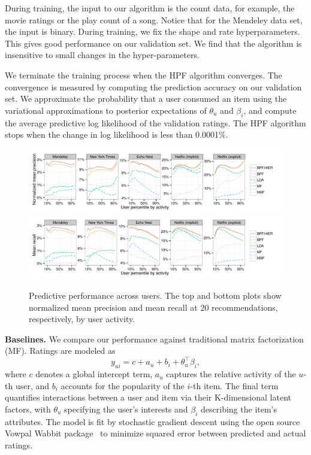 During training, the input to our algorithm is the count data, for
example, the movie ratings or the play count of a song. Notice that
for the Mendeley data set, the input is binary. During training, we
fix the shape and rate hyperparameters. This gives good performance on
our validation set. We find that the algorithm is insensitive to small
changes in the hyper-parameters.

We terminate the training process when the HPF algorithm
converges. The convergence is measured by computing the prediction
accuracy on our validation set. We approximate the probability that a
user consumed an item using the variational approximations to
posterior expectations of $\theta_u$ and $\beta_i$, and compute the
average predictive log likelihood of the validation ratings. The HPF
algorithm stops when the change in log likelihood is less than
0.0001\%.

\begin{figure}[t!]
\centering
\includegraphics[width=\textwidth]{figures/mean_precision_at_20_by_user_percentile.pdf}\\
\includegraphics[width=\textwidth]{figures/mean_recall_at_20_by_user_percentile.pdf}\\
\caption{Predictive performance across users. The top and bottom plots
  show normalized mean precision and mean recall at 20
  recommendations, respectively, by user activity.}
\label{fig:precision_recall_by_user_activity}
\end{figure}


{\bf Baselines.} We compare our performance against traditional matrix
factorization (MF). Ratings are modeled as
\begin{equation*}
  y_{ui} = c + a_u + b_i + \theta_u^\top \beta_i,
\end{equation*}
where $c$ denotes a global intercept term, $a_u$ captures the relative
activity of the $u$-th user, and $b_i$ accounts for the popularity of
the $i$-th item. The final term quantifies interactions between a user
and item via their K-dimensional latent factors, with $\theta_u$ specifying
the user's interests and $\beta_i$ describing the item's attributes. The
model is fit by stochastic gradient descent using the open source
Vowpal Wabbit package~\cite{Weinberger:2009} to minimize squared error
between predicted and actual ratings.


